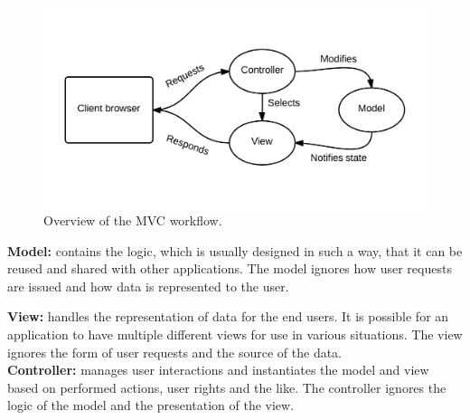 \begin{figure}[h]
\includegraphics[width=\textwidth]{img/mvc.png}
\caption{Overview of the MVC workflow.}
\label{fig:mvc}
\end{figure}

\textbf{Model:} contains the logic, which is usually designed in such a way, that it can be reused and shared with other applications.
The model ignores how user requests are issued and how data is represented to the user.\newline

\textbf{View:} handles the representation of data for the end users.
It is possible for an application to have multiple different views for use in various situations.
The view ignores the form of user requests and the source of the data.\\

\textbf{Controller:} manages user interactions and instantiates the model and view based on performed actions, user rights and the like.
The controller ignores the logic of the model and the presentation of the view.


